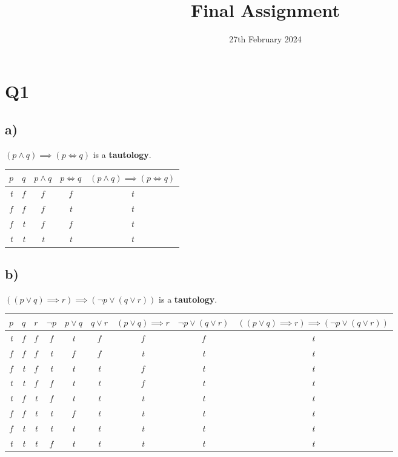 \documentclass{article}
\title{Final Assignment}
\date{\vspace{-1.0cm}27th February 2024}
\begin{document}
\maketitle

\section*{Q1}

\subsection*{\small a)}
$(p \land q) \implies (p \iff q)$ is a \textbf{tautology}.

\begin{table}[h!]
\begin{tabular}{|c c c c c|} 
\hline 
$p$ & $q$ & $p \land q$ & $p \iff q$ & $(p \land q) \implies (p \iff q)$ \\
\hline
\em{t} & \em{f} & \em{f} & \em{f} & \em{t}  \\ 
\em{f} & \em{f} & \em{f} & \em{t} & \em{t}  \\
\em{f} & \em{t} & \em{f} & \em{f} & \em{t}  \\
\em{t} & \em{t} & \em{t} & \em{t} & \em{t}  \\
\hline
\end{tabular}
\end{table}

\subsection*{\small b)}
$((p \lor q) \implies r) \implies ( \lnot p \lor ( q \lor r ))$ is a \textbf{tautology}.

\begin{table}[h!]
\begin{tabular}{|c c c c c c c c c|} 
\hline 
$p$ & $q$ & $r$ & $\lnot p$ & $p \lor q$ & $q \lor r$ & $(p \lor q) \implies r$ & $\lnot p \lor (q \lor r)$ & $((p \lor q) \implies r) \implies (\lnot p \lor (q \lor r))$ \\
\hline
\em{t} & \em{f} & \em{f} & \em{f} & \em{t} & \em{f} & \em{f} & \em{f} & \em{t}  \\ 
\em{f} & \em{f} & \em{f} & \em{t} & \em{f} & \em{f} & \em{t} & \em{t} & \em{t}  \\
\em{f} & \em{t} & \em{f} & \em{t} & \em{t} & \em{t} & \em{f} & \em{t} & \em{t}  \\
\em{t} & \em{t} & \em{f} & \em{f} & \em{t} & \em{t} & \em{f} & \em{t} & \em{t}  \\
\em{t} & \em{f} & \em{t} & \em{f} & \em{t} & \em{t} & \em{t} & \em{t} & \em{t}  \\ 
\em{f} & \em{f} & \em{t} & \em{t} & \em{f} & \em{t} & \em{t} & \em{t} & \em{t}  \\
\em{f} & \em{t} & \em{t} & \em{t} & \em{t} & \em{t} & \em{t} & \em{t} & \em{t}  \\
\em{t} & \em{t} & \em{t} & \em{f} & \em{t} & \em{t} & \em{t} & \em{t} & \em{t}  \\
\hline
\end{tabular}
\end{table}
\end{document}

